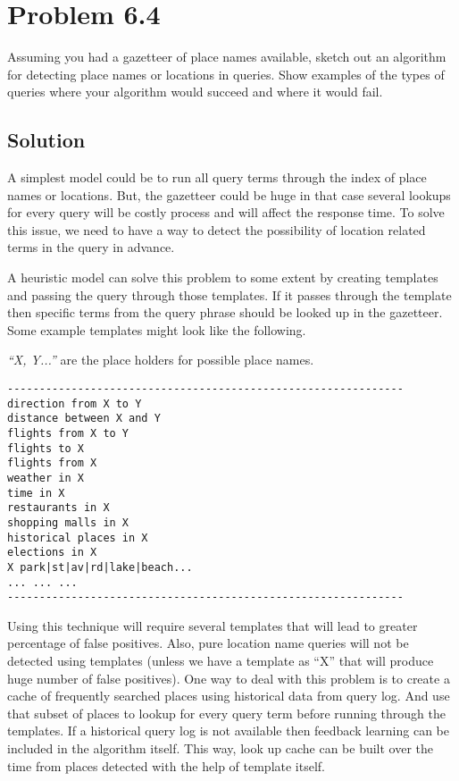 \documentclass[letterpaper,12pt]{article}
\begin{document}
\section{Problem 6.4}

Assuming you had a gazetteer of place names available, sketch out an algorithm for detecting place names or locations in queries. Show examples of the types of queries where your algorithm would succeed and where it would fail.

\subsection{Solution}

A simplest model could be to run all query terms through the index of place names or locations. But, the gazetteer could be huge in that case several lookups for every query will be costly process and will affect the response time. To solve this issue, we need to have a way to detect the possibility of location related terms in the query in advance.

A heuristic model can solve this problem to some extent by creating templates and passing the query through those templates. If it passes through the template then specific terms from the query phrase should be looked up in the gazetteer. Some example templates might look like the following.

\emph{``X, Y...''} are the place holders for possible place names.

\begin{verbatim}
--------------------------------------------------------------
direction from X to Y
distance between X and Y
flights from X to Y
flights to X
flights from X
weather in X
time in X
restaurants in X
shopping malls in X
historical places in X
elections in X
X park|st|av|rd|lake|beach...
... ... ...
--------------------------------------------------------------
\end{verbatim}

Using this technique will require several templates that will lead to greater percentage of false positives. Also, pure location name queries will not be detected using templates (unless we have a template as ``X'' that will produce huge number of false positives). One way to deal with this problem is to create a cache of frequently searched places using historical data from query log. And use that subset of places to lookup for every query term before running through the templates. If a historical query log is not available then feedback learning can be included in the algorithm itself. This way, look up cache can be built over the time from places detected with the help of template itself.
\end{document}
